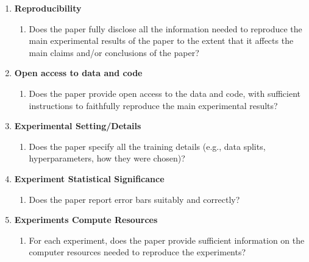 \documentclass{article}
\begin{document}
\begin{enumerate}
\item {\bf Reproducibility}
    \begin{enumerate}
        \item Does the paper fully disclose all the information needed to reproduce the main experimental results of the paper to the extent that it affects the main claims and/or conclusions of the paper?
    \end{enumerate}

\item {\bf Open access to data and code}
    \begin{enumerate}
        \item Does the paper provide open access to the data and code, with sufficient instructions to faithfully reproduce the main experimental results?
    \end{enumerate}

\item {\bf Experimental Setting/Details}
    \begin{enumerate}
        \item Does the paper specify all the training details (e.g., data splits, hyperparameters, how they were chosen)?
    \end{enumerate}

\item {\bf Experiment Statistical Significance}
    \begin{enumerate}
        \item Does the paper report error bars suitably and correctly?
    \end{enumerate}

\item {\bf Experiments Compute Resources}
    \begin{enumerate}
        \item For each experiment, does the paper provide sufficient information on the computer resources needed to reproduce the experiments?
    \end{enumerate}


\end{enumerate}
\end{document}

